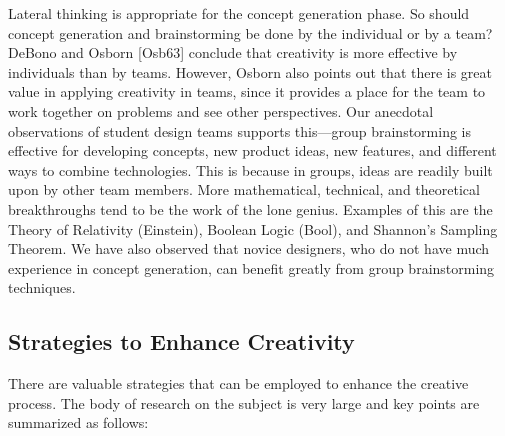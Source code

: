 Lateral thinking is appropriate for the concept generation phase. So
should concept gen­eration and brainstorming be done by the individual or
by a team? DeBono and Osborn {[}Osb63{]} conclude that creativity is
more effective by individuals than by teams. However, Osborn also points
out that there is great value in applying creativity in teams, since it
provides a place for the team to work together on problems and see other
perspectives. Our anecdotal observations of student design teams
supports this---group brainstorming is effective for developing
concepts, new product ideas, new features, and different ways to combine
technologies. This is because in groups, ideas are readily built upon by
other team members. More mathe­matical, technical, and theoretical
breakthroughs tend to be the work of the lone genius. Ex­amples of this
are the Theory of Relativity (Einstein), Boolean Logic (Bool), and
Shannon's Sampling Theorem. We have also observed that novice designers,
who do not have much experience in concept generation, can benefit
greatly from group brainstorming techniques.

\subsection{Strategies to Enhance Creativity}
\label{subsection:strategies-to-enhance-creativity}

There are valuable strategies that can be employed to enhance the
creative process. The body of research on the subject is very large and
key points are summarized as follows:

